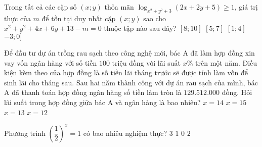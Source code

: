 \begin{ex}%
	Trong tất cả các cặp số $(x;y)$   thỏa mãn  $\log_{x^2+y^2+3} (2x+2y+5)\ge 1$, giá trị thực của $m$ để tồn tại duy nhất cặp $(x;y)$  sao cho $x^2+y^2+4x+6y+13-m=0$  thuộc tập nào sau đây?
	\choice
	{\True $[8;10]$}
	{$[5;7]$}
	{$[1;4]$}
	{$-3;0]$}
\end{ex}
\begin{ex}%
	Để đầu tư dự án trồng rau sạch theo công nghệ mới, bác A đã làm hợp đồng xin vay vốn ngân hàng với số tiền $100$ triệu đồng với lãi suất $x\%$ trên một năm. Điều kiện kèm theo của hợp đồng là số tiền lãi tháng trước sẽ được tính làm vốn để sinh lãi cho tháng sau. Sau hai năm thành công với dự án rau sạch của mình, bác A đã thanh toán hợp đồng ngân hàng số tiền làm tròn là $129.512. 000$ đồng. Hỏi lãi suất trong hợp đồng giữa bác A và ngân hàng là bao nhiêu?
	\choice
	{$x=14$}
	{$x=15$}
	{\True $x=13$}
	{$x=12$}
\end{ex}
\begin{ex}%
	Phương trình $\left(\dfrac{1}{2}\right)^x=1$  có bao nhiêu nghiệm thực?
	\choice
	{$3$}
	{\True $1$}
	{$0$}
	{$2$}
\end{ex}
